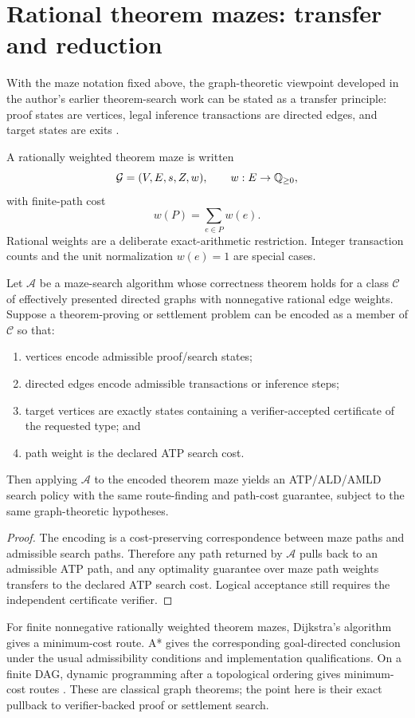 \section{Rational theorem mazes: transfer and reduction}
With the maze notation fixed above, the graph-theoretic viewpoint developed in the author's earlier theorem-search work can be stated as a transfer principle: proof states are vertices, legal inference transactions are directed edges, and target states are exits \cite{depths}.

A rationally weighted theorem maze is written
\[
\mathcal G=(V,E,s,Z,w),
\qquad
w:E\to\mathbb{Q}_{\ge 0},
\]
with finite-path cost
\[
w(P)=\sum_{e\in P}w(e).
\]
Rational weights are a deliberate exact-arithmetic restriction. Integer transaction counts and the unit normalization $w(e)=1$ are special cases.

\begin{theorem}
Let $\mathcal A$ be a maze-search algorithm whose correctness theorem holds for a class $\mathscr C$ of effectively presented directed graphs with nonnegative rational edge weights. Suppose a theorem-proving or settlement problem can be encoded as a member of $\mathscr C$ so that:
\begin{enumerate}[label=(\roman*)]
\item vertices encode admissible proof/search states;
\item directed edges encode admissible transactions or inference steps;
\item target vertices are exactly states containing a verifier-accepted certificate of the requested type; and
\item path weight is the declared ATP search cost.
\end{enumerate}
Then applying $\mathcal A$ to the encoded theorem maze yields an ATP/ALD/AMLD search policy with the same route-finding and path-cost guarantee, subject to the same graph-theoretic hypotheses.
\end{theorem}
\begin{proof}
The encoding is a cost-preserving correspondence between maze paths and admissible search paths. Therefore any path returned by $\mathcal A$ pulls back to an admissible ATP path, and any optimality guarantee over maze path weights transfers to the declared ATP search cost. Logical acceptance still requires the independent certificate verifier.
\end{proof}

\begin{remark}
For finite nonnegative rationally weighted theorem mazes, Dijkstra's algorithm gives a minimum-cost route. A* gives the corresponding goal-directed conclusion under the usual admissibility conditions and implementation qualifications. On a finite DAG, dynamic programming after a topological ordering gives minimum-cost routes \cite{dijkstra,astar,clrs}. These are classical graph theorems; the point here is their exact pullback to verifier-backed proof or settlement search.
\end{remark}

